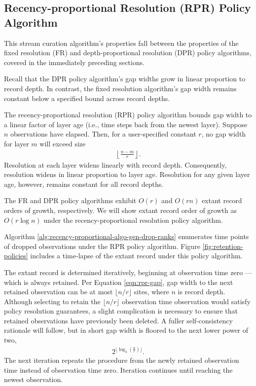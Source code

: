 \subsection{Recency-proportional Resolution (RPR) Policy Algorithm}
\label{sec:recency-proportional-resolution-algo}

This stream curation algorithm's properties fall between the properties of the fixed resolution (FR) and depth-proportional resolution (DPR) policy algorithms, covered in the immediately preceding sections.

Recall that the DPR policy algorithm's gap widths grow in linear proportion to record depth.
In contrast, the fixed resolution algorithm's gap width remains constant below a specified bound across record depths.

The recency-proportional resolution (RPR) policy algorithm bounds gap width to a linear factor of layer age (i.e., time steps back from the newest layer).
Suppose $n$ observations have elapsed.
Then, for a user-specified constant $r$, no gap width for layer $m$ will exceed size
\begin{align}
  \left\lfloor \frac{n - m}{r} \right\rfloor.
  \label{eqn:rpr-gap}
\end{align}
Resolution at each layer widens linearly with record depth.
Consequently, resolution widens in linear proportion to layer age.
Resolution for any given layer age, however, remains constant for all record depths.

The FR and DPR policy algorithms exhibit $O(r)$ and $O(rn)$ extant record orders of growth, respectively.
We will show extant record order of growth as $O(r\log{n})$ under the recency-proportional resolution policy algorithm.

Algorithm \ref{alg:recency-proportional-algo-gen-drop-ranks} enumerates time points of dropped observations under the RPR policy algorithm.
Figure \ref{fig:retention-policies} includes a time-lapse of the extant record under this policy algorithm.

The extant record is determined iteratively, beginning at observation time zero --- which is always retained.
Per Equation \ref{eqn:rpr-gap}, gap width to the next retained observation can be at most $\lfloor n/r \rfloor$ sites, where $n$ is record depth.
Although selecting to retain the $\lfloor n/r \rfloor$ observation time observation would satisfy policy resolution guarantees, a slight complication is necessary to ensure that retained observations have previously been deleted.
A fuller self-consistency rationale will follow, but in short gap width is floored to the next lower power of two,
\begin{align*}
  2^{\lfloor \log_{2}\left(\frac{n}{r}\right) \rfloor}.
\end{align*}
The next iteration repeats the procedure from the newly retained observation time instead of observation time zero.
Iteration continues until reaching the newest observation.

